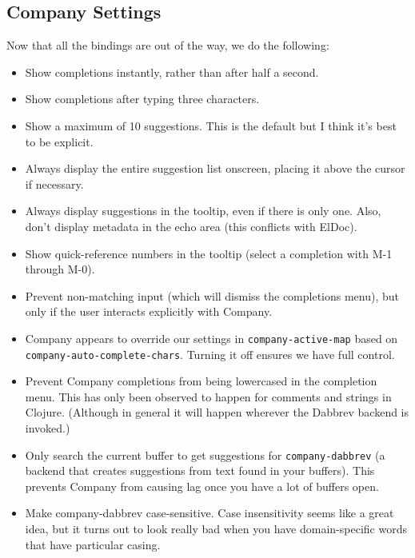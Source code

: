 \documentclass[11pt]{article}
\begin{document}
\subsection{Company Settings}
\label{sec:orgdb2a272}
Now that all the bindings are out of the way, we do the following:
\begin{itemize}
\item Show completions instantly, rather than after half a second.
\item Show completions after typing three characters.
\item Show a maximum of 10 suggestions. This is the default but I think
it's best to be explicit.
\item Always display the entire suggestion list onscreen, placing it above
the cursor if necessary.
\item Always display suggestions in the tooltip, even if there is only
one. Also, don't display metadata in the echo area (this conflicts
with ElDoc).
\item Show quick-reference numbers in the tooltip (select a completion
with M-1 through M-0).
\item Prevent non-matching input (which will dismiss the completions
menu), but only if the user interacts explicitly with Company.
\item Company appears to override our settings in \texttt{company-active-map}
based on \texttt{company-auto-complete-chars}. Turning it off ensures we
have full control.
\item Prevent Company completions from being lowercased in the
completion menu. This has only been observed to happen for
comments and strings in Clojure. (Although in general it will
happen wherever the Dabbrev backend is invoked.)
\item Only search the current buffer to get suggestions for
\texttt{company-dabbrev} (a backend that creates suggestions from text
found in your buffers). This prevents Company from causing lag
once you have a lot of buffers open.
\item Make company-dabbrev case-sensitive. Case insensitivity seems
like a great idea, but it turns out to look really bad when you
have domain-specific words that have particular casing.
\end{itemize}
\end{document}
